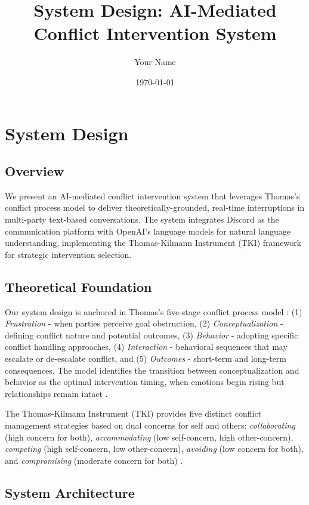 \documentclass[12pt,a4paper]{article}
\title{System Design: AI-Mediated Conflict Intervention System}
\author{Your Name}
\date{\today}
\begin{document}
\maketitle

\section{System Design}

\subsection{Overview}
We present an AI-mediated conflict intervention system that leverages Thomas's conflict process model to deliver theoretically-grounded, real-time interruptions in multi-party text-based conversations. The system integrates Discord as the communication platform with OpenAI's language models for natural language understanding, implementing the Thomas-Kilmann Instrument (TKI) framework for strategic intervention selection.

\subsection{Theoretical Foundation}
Our system design is anchored in Thomas's five-stage conflict process model \cite{thomas1992conflict}: (1) \textit{Frustration} - when parties perceive goal obstruction, (2) \textit{Conceptualization} - defining conflict nature and potential outcomes, (3) \textit{Behavior} - adopting specific conflict handling approaches, (4) \textit{Interaction} - behavioral sequences that may escalate or de-escalate conflict, and (5) \textit{Outcomes} - short-term and long-term consequences. The model identifies the transition between conceptualization and behavior as the optimal intervention timing, when emotions begin rising but relationships remain intact \cite{thomas1992conflict}.

The Thomas-Kilmann Instrument (TKI) provides five distinct conflict management strategies based on dual concerns for self and others: \textit{collaborating} (high concern for both), \textit{accommodating} (low self-concern, high other-concern), \textit{competing} (high self-concern, low other-concern), \textit{avoiding} (low concern for both), and \textit{compromising} (moderate concern for both) \cite{kilmann2017thomas}.

\subsection{System Architecture}
\end{document}
